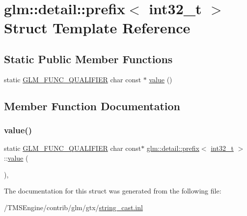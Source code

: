 \hypertarget{structglm_1_1detail_1_1prefix_3_01int32__t_01_4}{}\section{glm\+:\+:detail\+:\+:prefix$<$ int32\+\_\+t $>$ Struct Template Reference}
\label{structglm_1_1detail_1_1prefix_3_01int32__t_01_4}
\subsection*{Static Public Member Functions}
\begin{DoxyCompactItemize}
\item 
static \hyperlink{setup_8hpp_a33fdea6f91c5f834105f7415e2a64407}{G\+L\+M\+\_\+\+F\+U\+N\+C\+\_\+\+Q\+U\+A\+L\+I\+F\+I\+ER} char const  $\ast$ \hyperlink{structglm_1_1detail_1_1prefix_3_01int32__t_01_4_a1e2bfac810e1195fa173ebca0dcdca57}{value} ()
\end{DoxyCompactItemize}


\subsection{Member Function Documentation}
\mbox{\label{structglm_1_1detail_1_1prefix_3_01int32__t_01_4_a1e2bfac810e1195fa173ebca0dcdca57}} 
\subsubsection{\texorpdfstring{value()}{value()}}
{\footnotesize\ttfamily static \hyperlink{setup_8hpp_a33fdea6f91c5f834105f7415e2a64407}{G\+L\+M\+\_\+\+F\+U\+N\+C\+\_\+\+Q\+U\+A\+L\+I\+F\+I\+ER} char const$\ast$ \hyperlink{structglm_1_1detail_1_1prefix}{glm\+::detail\+::prefix}$<$ \hyperlink{group__gtc__type__precision_gab870c0eb6f525b0c8c4716762e0fc3a8}{int32\+\_\+t} $>$\+::\hyperlink{_s_d_l__opengl__glext_8h_a8ad81492d410ff2ac11f754f4042150f}{value} (\begin{DoxyParamCaption}{ }\end{DoxyParamCaption})\hspace{0.3cm}{\ttfamily [inline]}, {\ttfamily [static]}}



The documentation for this struct was generated from the following file\+:\begin{DoxyCompactItemize}
\item 
/\+T\+M\+S\+Engine/contrib/glm/gtx/\hyperlink{string__cast_8inl}{string\+\_\+cast.\+inl}\end{DoxyCompactItemize}
